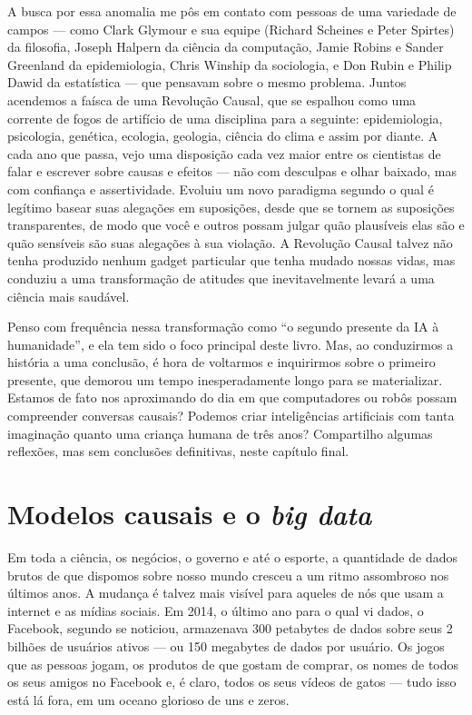 \documentclass[11pt,a5paper,twoside]{book}
\begin{document}
A busca por essa anomalia me pôs em contato com pessoas de uma variedade de campos — como Clark Glymour e sua equipe (Richard Scheines e Peter Spirtes) da filosofia, Joseph Halpern da ciência da computação, Jamie Robins e Sander Greenland da epidemiologia, Chris Winship da sociologia, e Don Rubin e Philip Dawid da estatística — que pensavam sobre o mesmo problema. Juntos acendemos a faísca de uma Revolução Causal, que se espalhou como uma corrente de fogos de artifício de uma disciplina para a seguinte: epidemiologia, psicologia, genética, ecologia, geologia, ciência do clima e assim por diante. A cada ano que passa, vejo uma disposição cada vez maior entre os cientistas de falar e escrever sobre causas e efeitos — não com desculpas e olhar baixado, mas com confiança e assertividade. Evoluiu um novo paradigma segundo o qual é legítimo basear suas alegações em suposições, desde que se tornem as suposições transparentes, de modo que você e outros possam julgar quão plausíveis elas são e quão sensíveis são suas alegações à sua violação. A Revolução Causal talvez não tenha produzido nenhum gadget particular que tenha mudado nossas vidas, mas conduziu a uma transformação de atitudes que inevitavelmente levará a uma ciência mais saudável.

Penso com frequência nessa transformação como “o segundo presente da IA à humanidade”, e ela tem sido o foco principal deste livro. Mas, ao conduzirmos a história a uma conclusão, é hora de voltarmos e inquirirmos sobre o primeiro presente, que demorou um tempo inesperadamente longo para se materializar. Estamos de fato nos aproximando do dia em que computadores ou robôs possam compreender conversas causais? Podemos criar inteligências artificiais com tanta imaginação quanto uma criança humana de três anos? Compartilho algumas reflexões, mas sem conclusões definitivas, neste capítulo final.

\section{Modelos causais e o \textit{big data}}
Em toda a ciência, os negócios, o governo e até o esporte, a quantidade de dados brutos de que dispomos sobre nosso mundo cresceu a um ritmo assombroso nos últimos anos. A mudança é talvez mais visível para aqueles de nós que usam a internet e as mídias sociais. Em 2014, o último ano para o qual vi dados, o Facebook, segundo se noticiou, armazenava 300 petabytes de dados sobre seus 2 bilhões de usuários ativos — ou 150 megabytes de dados por usuário. Os jogos que as pessoas jogam, os produtos de que gostam de comprar, os nomes de todos os seus amigos no Facebook e, é claro, todos os seus vídeos de gatos — tudo isso está lá fora, em um oceano glorioso de uns e zeros.
\end{document}

